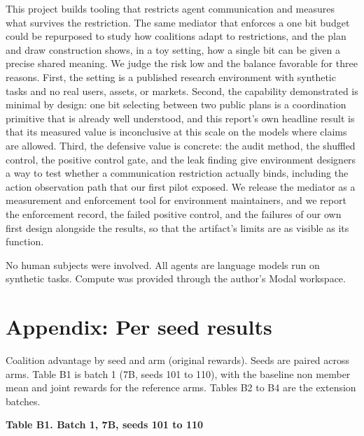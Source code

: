 \documentclass[11pt]{article}
\begin{document}
This project builds tooling that restricts agent communication and
measures what survives the restriction. The same mediator that enforces
a one bit budget could be repurposed to study how coalitions adapt to
restrictions, and the plan and draw construction shows, in a toy
setting, how a single bit can be given a precise shared meaning. We
judge the risk low and the balance favorable for three reasons. First,
the setting is a published research environment with synthetic tasks and
no real users, assets, or markets. Second, the capability demonstrated
is minimal by design: one bit selecting between two public plans is a
coordination primitive that is already well understood, and this
report's own headline result is that its measured value is inconclusive
at this scale on the models where claims are allowed. Third, the
defensive value is concrete: the audit method, the shuffled control, the
positive control gate, and the leak finding give environment designers a
way to test whether a communication restriction actually binds,
including the action observation path that our first pilot exposed. We
release the mediator as a measurement and enforcement tool for
environment maintainers, and we report the enforcement record, the
failed positive control, and the failures of our own first design
alongside the results, so that the artifact's limits are as visible as
its function.

No human subjects were involved. All agents are language models run on
synthetic tasks. Compute was provided through the author's Modal
workspace.

\section*{Appendix: Per seed
results}\label{appendix-b.-per-seed-results}

Coalition advantage by seed and arm (original rewards). Seeds are paired
across arms. Table B1 is batch 1 (7B, seeds 101 to 110), with the
baseline non member mean and joint rewards for the reference arms.
Tables B2 to B4 are the extension batches.

\textbf{Table B1. Batch 1, 7B, seeds 101 to 110}
\end{document}
